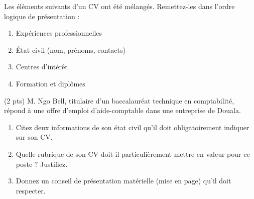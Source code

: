 \documentclass[11pt]{article}
\begin{document}
\begin{exercice}
Les éléments suivants d'un CV ont été mélangés. Remettez-les dans l'ordre logique de présentation :
\begin{enumerate}
  \item Expériences professionnelles
  \item État civil (nom, prénoms, contacts)
  \item Centres d'intérêt
  \item Formation et diplômes
\end{enumerate}
\end{exercice}

\begin{exercice} (2 pts)
M. Ngo Bell, titulaire d'un baccalauréat technique en comptabilité, répond à une offre d'emploi d'aide-comptable dans une entreprise de Douala.
\begin{enumerate}
  \item Citez deux informations de son état civil qu'il doit obligatoirement indiquer sur son CV.
  \item Quelle rubrique de son CV doit-il particulièrement mettre en valeur pour ce poste ? Justifiez.
  \item Donnez un conseil de présentation matérielle (mise en page) qu'il doit respecter.
\end{enumerate}
\end{exercice}
\end{document}
